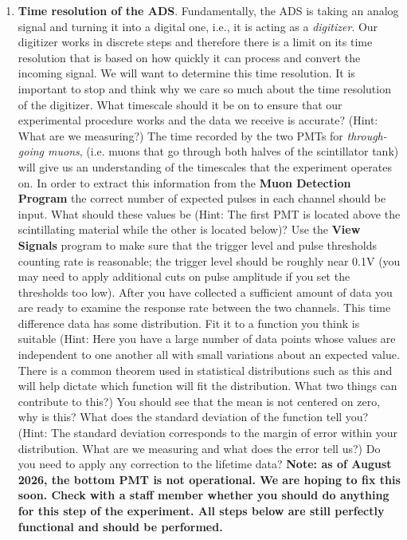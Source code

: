 \documentclass{../lab}
\begin{document}
\begin{enumerate}
    \item \textbf{Time resolution of the ADS}. Fundamentally, the ADS is taking an analog signal and turning it into a digital one, i.e., it is acting as a \textit{digitizer}. Our digitizer works in discrete steps and therefore there is a limit on its time resolution that is based on how quickly it can process and convert the incoming signal. We will want to determine this time resolution. It is important to stop and think why we care so much about the time resolution of the digitizer. What timescale should it be on to ensure that our experimental procedure works and the data we receive is accurate? (Hint: What are we measuring?) The time recorded by the two PMTs for \emph{through-going muons}, (i.e. muons that go through both halves of the scintillator tank) will give us an understanding of the timescales that the experiment operates on. In order to extract this information from the \textbf{Muon Detection Program} the correct number of expected pulses in each channel should be input. What should these values be (Hint: The first PMT is located above the scintillating material while the other is located below)? Use the \textbf{View Signals} program to make sure that the trigger level and pulse thresholds counting rate is reasonable; the trigger level should be roughly near 0.1V (you may need to apply additional cuts on pulse amplitude if you set the thresholds too low). After you have collected a sufficient amount of data you are ready to examine the response rate between the two channels. This time difference data has some distribution. Fit it to a function you think is suitable (Hint: Here you have a large number of data points whose values are independent to one another all with small variations about an expected value. There is a common theorem used in statistical distributions such as this and will help dictate which function will fit the distribution. What two things can contribute to this?) You should see that the mean is not centered on zero, why is this? What does the standard deviation of the function tell you? (Hint: The standard deviation corresponds to the margin of error within your distribution. What are we measuring and what does the error tell us?) Do you need to apply any correction to the lifetime data? \textbf{Note: as of August 2026, the bottom PMT is not operational. We are hoping to fix this soon. Check with a staff member whether you should do anything for this step of the experiment. All steps below are still perfectly functional and should be performed.}
    

\end{enumerate}
\end{document}
